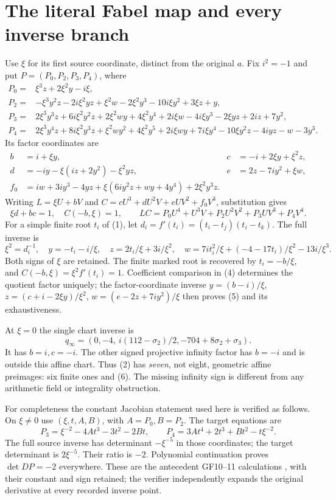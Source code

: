 \section{The literal Fabel map and every inverse branch}
Use $\xi$ for its first source coordinate, distinct from the original $a$.
Fix $i^2=-1$ and put $P=(P_0,P_2,P_3,P_4)$, where
\begin{align*}
 P_0={}&\xi^3z+2\xi^2y-i\xi,\\
 P_2={}&-\xi^3y^2z-2i\xi^2yz+\xi^2w-2\xi^2y^3-10i\xi y^2+3\xi z+y,\\
 P_3={}&2\xi^3y^3z+6i\xi^2y^2z+2\xi^2wy+4\xi^2y^4
             +2i\xi w-4i\xi y^3-2\xi yz+2iz+7y^2,\\
 P_4={}&2\xi^3y^4z+8i\xi^2y^3z+\xi^2wy^2+4\xi^2y^5
             +2i\xi wy+7i\xi y^4-10\xi y^2z-4iyz-w-3y^3.
                                                               \tag{3}
\end{align*}
Its factor coordinates are
\begin{align*}
 b&=i+\xi y,&c&=-i+2\xi y+\xi^2z,\\
 d&=-iy-\xi(iz+2y^2)-\xi^2yz,&e&=2z-7iy^2+\xi w,\\
 f_0&=iw+3iy^3-4yz+\xi(6iy^2z+wy+4y^4)+2\xi^2y^3z.
\end{align*}
Writing $L=\xi U+bV$ and $C=cU^3+dU^2V+eUV^2+f_0V^3$, substitution gives
\[
 \xi d+bc=1,\quad C(-b,\xi)=1,\qquad
 LC=P_0U^4+U^3V+P_2U^2V^2+P_3UV^3+P_4V^4.          \tag{4}
\]
For a simple finite root $t_i$ of (1), let
$d_i=f'(t_i)=(t_i-t_j)(t_i-t_k)$. The full inverse is
\[
 \boxed{\xi^2=d_i^{-1},\quad y=-t_i-i/\xi,\quad
 z=2t_i/\xi+3i/\xi^2,\quad
 w=7it_i^2/\xi+(-4-17t_i)/\xi^2-13i/\xi^3.}         \tag{5}
\]
Both signs of $\xi$ are retained. The finite marked root is recovered by
$t_i=-b/\xi$, and $C(-b,\xi)=\xi^2 f'(t_i)=1$.
Coefficient comparison in (4) determines the quotient factor uniquely; the
factor-coordinate inverse
$y=(b-i)/\xi$, $z=(c+i-2\xi y)/\xi^2$,
$w=(e-2z+7iy^2)/\xi$ then proves (5) and its exhaustiveness.

At $\xi=0$ the single chart inverse is
\[
 q_\infty=(0,-4,\ i(112-\sigma_2)/2,
                 -704+8\sigma_2+\sigma_3).          \tag{6}
\]
It has $b=i,c=-i$. The other signed projective infinity factor has $b=-i$
and is outside this affine chart. Thus (2) has \emph{seven}, not eight,
geometric affine preimages: six finite ones and (6). The missing infinity
sign is different from any arithmetic field or integrality obstruction.

For completeness the constant Jacobian statement used here is verified as
follows. On $\xi\ne0$ use $(\xi,t,A,B)$, with $A=P_0,B=P_2$.
The target equations are
\[
 P_3=\xi^{-2}-4At^3-3t^2-2Bt,\qquad
 P_4=3At^4+2t^3+Bt^2-t\xi^{-2}.
\]
The full source inverse has determinant $-\xi^{-5}$ in those coordinates;
the target determinant is $2\xi^{-5}$. Their ratio is $-2$.
Polynomial continuation proves $\det DP=-2$ everywhere. These are the
antecedent GF10--11 calculations \cite{Zeta}, with their constant and sign
retained; the verifier independently expands the original derivative at every
recorded inverse point.

